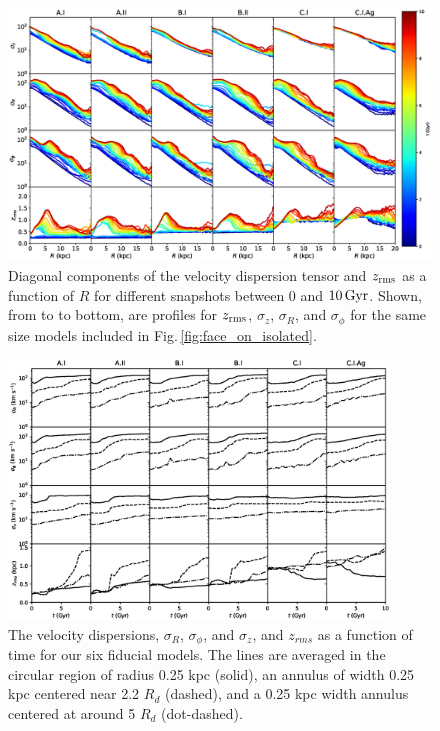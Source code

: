 \begin{figure}
	\centering
	\includegraphics[width=\textwidth]{../figures/isolated_dispersion_evolution_with_agama_zrms.eps}
	\caption{Diagonal components of the velocity dispersion tensor
          and $z_{\rm rms}$ as a function of $R$ for different snapshots
          between $0$ and $10\,{\rm Gyr}$.  Shown, from to to bottom,
          are profiles for $z_{\rm rms}$, $\sigma_z$, $\sigma_R$, and $\sigma_\phi$
          for the same size models included in
          Fig.\,\ref{fig:face_on_isolated}.} \label{fig:isolated_dispersions}
\end{figure}

\begin{figure}
\centering
\includegraphics[width=0.9\textwidth]{../figures/dispersions_vs_time.eps}
\caption{The velocity dispersions, $\sigma_R$, $\sigma_\phi$, and $\sigma_z$, and $z_{rms}$
as a function of time for our six fiducial models. The lines are averaged in the circular region
of radius 0.25 kpc (solid), an annulus of width 0.25 kpc centered near 2.2 $R_d$ (dashed),
and a 0.25 kpc width annulus centered at around 5 $R_d$ (dot-dashed). } \label{fig:dispersions_vs_time}
\end{figure}


